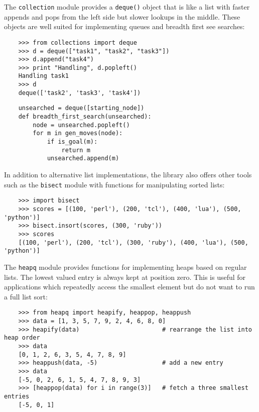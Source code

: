 \documentclass[UTF8]{article}
\begin{document}
The \texttt{collection} module provides a \texttt{deque()} object that is like a list with faster
appends and pops from the left side but slower lookups in the middle. These objects are well suited
for implementing queues and breadth first see searches:
\begin{verbatim}
    >>> from collections import deque
    >>> d = deque(["task1", "task2", "task3"])
    >>> d.append("task4")
    >>> print "Handling", d.popleft()
    Handling task1
    >>> d
    deque(['task2', 'task3', 'task4'])
\end{verbatim}

\begin{verbatim}
    unsearched = deque([starting_node])
    def breadth_first_search(unsearched):
        node = unsearched.popleft()
        for m in gen_moves(node):
            if is_goal(m):
                return m
            unsearched.append(m)
\end{verbatim}

In addition to alternative list implementations, the library also offers other tools such as the
\texttt{bisect} module with functions for manipulating sorted lists:
\begin{verbatim}
    >>> import bisect
    >>> scores = [(100, 'perl'), (200, 'tcl'), (400, 'lua'), (500, 'python')]
    >>> bisect.insort(scores, (300, 'ruby'))
    >>> scores
    [(100, 'perl'), (200, 'tcl'), (300, 'ruby'), (400, 'lua'), (500, 'python')]
\end{verbatim}

The \texttt{heapq} module provides functions for implementing heaps based on regular lists. The
lowest valued entry is always kept at position zero. This is useful for applications which
repeatedly access the smallest element but do not want to run a full list sort:
\begin{verbatim}
    >>> from heapq import heapify, heappop, heappush
    >>> data = [1, 3, 5, 7, 9, 2, 4, 6, 8, 0]
    >>> heapify(data)                       # rearrange the list into heap order
    >>> data
    [0, 1, 2, 6, 3, 5, 4, 7, 8, 9]
    >>> heappush(data, -5)                  # add a new entry
    >>> data
    [-5, 0, 2, 6, 1, 5, 4, 7, 8, 9, 3]
    >>> [heappop(data) for i in range(3)]   # fetch a three smallest entries
    [-5, 0, 1]
\end{verbatim}
\end{document}

